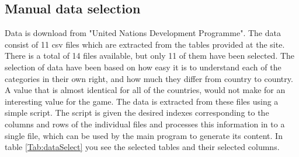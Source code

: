 \documentclass[a4paper,11pt]{article}
\begin{document}
\subsection{Manual data selection}
\label{meth:dataselect}
Data is download from "United Nations Development Programme"\cite{undpMain}. The data consist of 11 csv files which are extracted from the tables provided at the site. There is a total of 14 files available, but only 11 of them have been selected. The selection of data have been based on how easy it is to understand each of the categories in their own right, and how much they differ from country to country. A value that is almost identical for all of the countries, would not make for an interesting value for the game. 
The data is extracted from these files using a simple script. The script is given the desired indexes corresponding to the columns and rows of the individual files and processes this information in to a single file, which can be used by the main program to generate its content. In table \ref{Tab:dataSelect} you see the selected tables and their selected columns.
\end{document}
